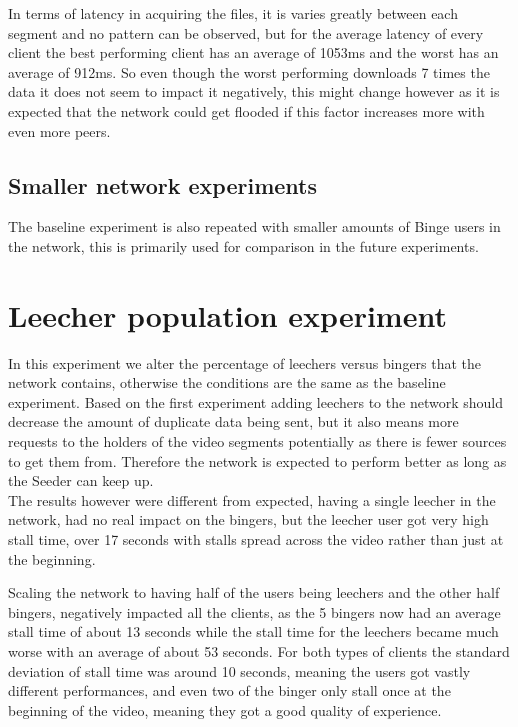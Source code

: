 

In terms of latency in acquiring the files, it is varies greatly between each segment and no pattern can be observed, but for the average latency of every client the best performing client has an average of 1053\acs{ms} and the worst has an average of 912\acs{ms}. 
So even though the worst performing downloads 7 times the data it does not seem to impact it negatively, this might change however as it is expected that the network could get flooded if this factor increases more with even more peers.

\subsection{Smaller network experiments}
The baseline experiment is also repeated with smaller amounts of Binge users in the network, this is primarily used for comparison in the future experiments.

\section{Leecher population experiment}
In this experiment we alter the percentage of leechers versus bingers that the network contains, otherwise the conditions are the same as the baseline experiment.
Based on the first experiment adding leechers to the network should decrease the amount of duplicate data being sent, but it also means more requests to the holders of the video segments potentially as there is fewer sources to get them from. Therefore the network is expected to perform better as long as the Seeder can keep up.\\
The results however were different from expected, having a single leecher in the network, had no real impact on the bingers, but the leecher user got very high stall time, over 17 seconds with stalls spread across the video rather than just at the beginning. 






Scaling the network to having half of the users being leechers and the other half bingers, negatively impacted all the clients, as the 5 bingers now had an average stall time of about 13 seconds while the stall time for the leechers became much worse with an average of about 53 seconds. For both types of clients the standard deviation of stall time was around 10 seconds, meaning the users got vastly different performances, and even two of the binger only stall once at the beginning of the video, meaning they got a good quality of experience.

